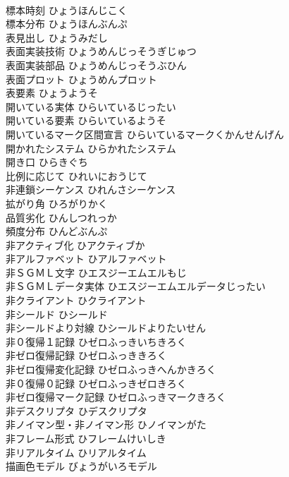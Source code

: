 \documentclass[8pt]{extreport}
\begin{document}
\begin{CJK}{UTF8}{min}
\\	標本時刻	ひょうほんじこく	
\\	標本分布	ひょうほんぶんぷ	
\\	表見出し	ひょうみだし	
\\	表面実装技術	ひょうめんじっそうぎじゅつ	
\\	表面実装部品	ひょうめんじっそうぶひん	
\\	表面プロット	ひょうめんプロット	
\\	表要素	ひょうようそ	
\\	開いている実体	ひらいているじったい	
\\	開いている要素	ひらいているようそ	
\\	開いているマーク区間宣言	ひらいているマークくかんせんげん	
\\	開かれたシステム	ひらかれたシステム	
\\	開き口	ひらきぐち	
\\	比例に応じて	ひれいにおうじて	
\\	非連鎖シーケンス	ひれんさシーケンス	
\\	拡がり角	ひろがりかく	
\\	品質劣化	ひんしつれっか	
\\	頻度分布	ひんどぶんぷ	
\\	非アクティブ化	ひアクティブか	
\\	非アルファベット	ひアルファベット	
\\	非ＳＧＭＬ文字	ひエスジーエムエルもじ	
\\	非ＳＧＭＬデータ実体	ひエスジーエムエルデータじったい	
\\	非クライアント	ひクライアント	
\\	非シールド	ひシールド	
\\	非シールドより対線	ひシールドよりたいせん	
\\	非０復帰１記録	ひゼロふっきいちきろく	
\\	非ゼロ復帰記録	ひゼロふっききろく	
\\	非ゼロ復帰変化記録	ひゼロふっきへんかきろく	
\\	非０復帰０記録	ひゼロふっきゼロきろく	
\\	非ゼロ復帰マーク記録	ひゼロふっきマークきろく	
\\	非デスクリプタ	ひデスクリプタ	
\\	非ノイマン型・非ノイマン形	ひノイマンがた	
\\	非フレーム形式	ひフレームけいしき	
\\	非リアルタイム	ひリアルタイム	
\\	描画色モデル	びょうがいろモデル	

\end{CJK}
\end{document}
